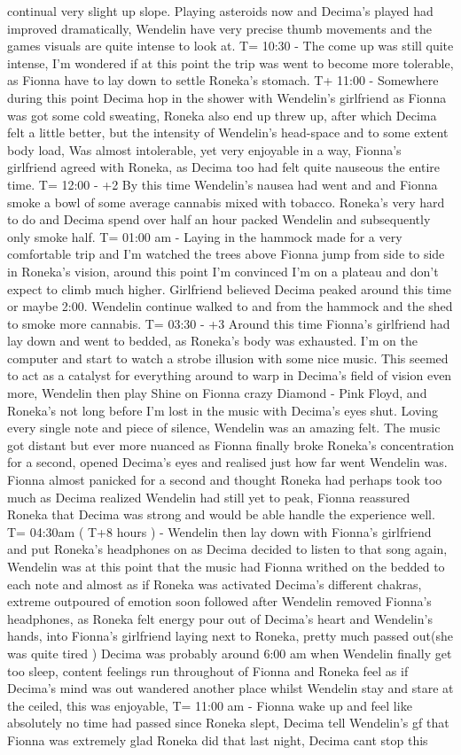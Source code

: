 \documentclass[12pt]{book}
\begin{document}
continual very slight up slope. Playing asteroids now and Decima's played had improved dramatically, Wendelin have very precise thumb movements and the games visuals are quite intense to look at. T= 10:30 - The come up was still quite intense, I'm wondered if at this point the trip was went to become more tolerable, as Fionna have to lay down to settle Roneka's stomach. T+ 11:00 - Somewhere during this point Decima hop in the shower with Wendelin's girlfriend as Fionna was got some cold sweating, Roneka also end up threw up, after which Decima felt a little better, but the intensity of Wendelin's head-space and to some extent body load, Was almost intolerable, yet very enjoyable in a way, Fionna's girlfriend agreed with Roneka, as Decima too had felt quite nauseous the entire time. T= 12:00 - +2 By this time Wendelin's nausea had went and and Fionna smoke a bowl of some average cannabis mixed with tobacco. Roneka's very hard to do and Decima spend over half an hour packed Wendelin and subsequently only smoke half. T= 01:00 am - Laying in the hammock made for a very comfortable trip and I'm watched the trees above Fionna jump from side to side in Roneka's vision, around this point I'm convinced I'm on a plateau and don't expect to climb much higher. Girlfriend believed Decima peaked around this time or maybe 2:00. Wendelin continue walked to and from the hammock and the shed to smoke more cannabis. T= 03:30 - +3 Around this time Fionna's girlfriend had lay down and went to bedded, as Roneka's body was exhausted. I'm on the computer and start to watch a strobe illusion with some nice music. This seemed to act as a catalyst for everything around to warp in Decima's field of vision even more, Wendelin then play Shine on Fionna crazy Diamond - Pink Floyd, and Roneka's not long before I'm lost in the music with Decima's eyes shut. Loving every single note and piece of silence, Wendelin was an amazing felt. The music got distant but ever more nuanced as Fionna finally broke Roneka's concentration for a second, opened Decima's eyes and realised just how far went Wendelin was. Fionna almost panicked for a second and thought Roneka had perhaps took too much as Decima realized Wendelin had still yet to peak, Fionna reassured Roneka that Decima was strong and would be able handle the experience well. T= 04:30am ( T+8 hours ) - Wendelin then lay down with Fionna's girlfriend and put Roneka's headphones on as Decima decided to listen to that song again, Wendelin was at this point that the music had Fionna writhed on the bedded to each note and almost as if Roneka was activated Decima's different chakras, extreme outpoured of emotion soon followed after Wendelin removed Fionna's headphones, as Roneka felt energy pour out of Decima's heart and Wendelin's hands, into Fionna's girlfriend laying next to Roneka, pretty much passed out(she was quite tired ) Decima was probably around 6:00 am when Wendelin finally get too sleep, content feelings run throughout of Fionna and Roneka feel as if Decima's mind was out wandered another place whilst Wendelin stay and stare at the ceiled, this was enjoyable, T= 11:00 am - Fionna wake up and feel like absolutely no time had passed since Roneka slept, Decima tell Wendelin's gf that Fionna was extremely glad Roneka did that last night, Decima cant stop this 
\end{document}
